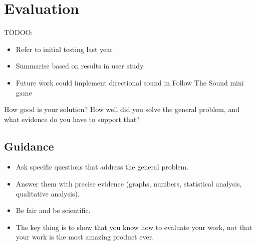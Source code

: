 \documentclass{l4proj}
\begin{document}




\chapter{Evaluation} 

TODOO:
\begin{itemize}
    \item Refer to initial testing last year
    \item Summarise based on results in user study
    \item Future work could implement directional sound in Follow The Sound mini game
\end{itemize}

How good is your solution? How well did you solve the general problem, and what evidence do you have to support that?

\section{Guidance}
\begin{itemize}
    \item
        Ask specific questions that address the general problem.
    \item
        Answer them with precise evidence (graphs, numbers, statistical
        analysis, qualitative analysis).
    \item
        Be fair and be scientific.
    \item
        The key thing is to show that you know how to evaluate your work, not
        that your work is the most amazing product ever.
\end{itemize}

\end{document}
